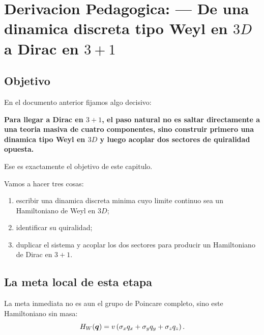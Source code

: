 \chapter{Derivacion Pedagogica: --- De una dinamica discreta tipo Weyl en \(3D\) a Dirac en \(3+1\)}
\label{ch:weyl-3d-a-dirac-3p1-discreto}







\section{Objetivo}

En el documento anterior fijamos algo decisivo:

\begin{displayquote}
\textbf{Para llegar a Dirac en \(3+1\), el paso natural no es saltar directamente a una teoria masiva de cuatro componentes, sino construir primero una dinamica tipo Weyl en \(3D\) y luego acoplar dos sectores de quiralidad opuesta.}
\end{displayquote}

Ese es exactamente el objetivo de este capitulo.

Vamos a hacer tres cosas:

\begin{enumerate}[leftmargin=*]
  \item escribir una dinamica discreta minima cuyo limite continuo sea un Hamiltoniano de Weyl en \(3D\);
  \item identificar su quiralidad;
  \item duplicar el sistema y acoplar los dos sectores para producir un Hamiltoniano de Dirac en \(3+1\).
\end{enumerate}

\section{La meta local de esta etapa}

La meta inmediata no es aun el grupo de Poincare completo, sino este Hamiltoniano sin masa:
\begin{equation}
H_W(\bm{q})= v\left(\sigma_x q_x + \sigma_y q_y + \sigma_z q_z\right).
\label{c07:eq:weyl-target}
\end{equation}


